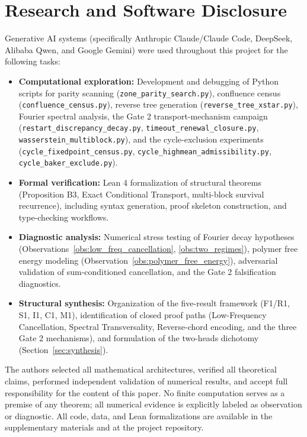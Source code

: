 \documentclass[12pt,a4paper]{article}
\theoremstyle{remark}
\begin{document}
\section{Research and Software Disclosure}
\label{sec:disclosure}
Generative AI systems (specifically Anthropic Claude/Claude Code, DeepSeek,
Alibaba Qwen, and Google Gemini) were used throughout this project for the
following tasks:
\begin{itemize}
\item \textbf{Computational exploration:} Development and debugging of Python
scripts for parity scanning (\texttt{zone\_parity\_search.py}), confluence
census (\texttt{confluence\_census.py}), reverse tree generation
(\texttt{reverse\_tree\_xstar.py}), Fourier spectral analysis, the Gate 2
transport-mechanism campaign (\texttt{restart\_discrepancy\_decay.py},
\texttt{timeout\_renewal\_closure.py}, \texttt{wasserstein\_multiblock.py}),
and the cycle-exclusion experiments (\texttt{cycle\_fixedpoint\_census.py},
\texttt{cycle\_highmean\_admissibility.py}, \texttt{cycle\_baker\_exclude.py}).
\item \textbf{Formal verification:} Lean 4 formalization of structural
theorems (Proposition B3, Exact Conditional Transport, multi-block survival
recurrence), including syntax generation, proof skeleton construction, and
type-checking workflows.
\item \textbf{Diagnostic analysis:} Numerical stress testing of Fourier decay
hypotheses (Observations~\ref{obs:low_freq_cancellation},
\ref{obs:two_regimes}), polymer free energy modeling
(Observation~\ref{obs:polymer_free_energy}), adversarial validation of
sum-conditioned cancellation, and the Gate 2 falsification diagnostics.
\item \textbf{Structural synthesis:} Organization of the five-result framework
(F1/R1, S1, I1, C1, M1), identification of closed proof paths
(Low-Frequency Cancellation, Spectral Transversality, Reverse-chord encoding,
and the three Gate 2 mechanisms), and formulation of the two-heads dichotomy
(Section~\ref{sec:synthesis}).
\end{itemize}
The authors selected all mathematical architectures, verified all theoretical
claims, performed independent validation of numerical results, and accept full
responsibility for the content of this paper. No finite computation serves as
a premise of any theorem; all numerical evidence is explicitly labeled as
observation or diagnostic.
All code, data, and Lean formalizations are available in the supplementary
materials and at the project repository.
\end{document}
